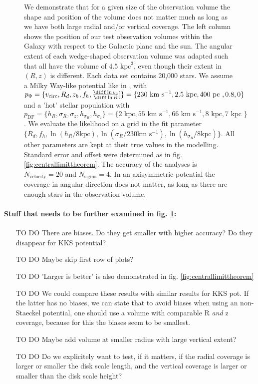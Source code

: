 \begin{figure}
\caption{We demonstrate that for a given size of the observation volume the shape and position of the volume does not matter much as long as we have both large radial and/or vertical coverage. The left column shows the position of our test observation volumes within the Galaxy with respect to the Galactic plane and the sun. The angular extent of each wedge-shaped observation volume was adapted such that all have the volume of $4.5 \text{ kpc}^3$, even though their extent in $(R,z)$ is different. Each data set contains 20,000 stars. We assume a Milky Way-like potential like in \citet{bov13}, with  $p_\Phi = \{v_\text{circ},R_d,z_h,f_h,\frac{\diff\ln v_c}{\diff\ln R}] \}=\{230 \text{ km s$^{-1}$},2.5\text{ kpc},400 \text{ pc }, 0.8,0\}$ and a 'hot' stellar population with $p_\text{DF} = \{ h_R, \sigma_R, \sigma_z,h_{\sigma_R},h_{\sigma_z}\} =\{2 \text{ kpc}, 55 \text{ km s$^{-1}$}, 66 \text{ km s$^{-1}$}, 8 \text{ kpc}, 7 \text{ kpc }\} $. We evaluate the likelihood on a grid in the fit parameter $\{R_d,f_h,\ln(h_R/8\text{kpc}),\ln(\sigma_{R}/230 \text{km s$^{-1}$}),\ln(h_{\sigma_R}/8\text{kpc}) \}$. All other parameters are kept at their true values in the modelling. Standard error and offset were determined as in fig. \ref{fig:centrallimittheorem}. The accuracy of the analyses is $N_\text{velocity} = 20$ and $N_\text{sigma} = 4$. In an axisymmetric potential the coverage in angular direction does not matter, as long as there are enough stars in the observation volume.}
\label{fig:obsvolumetest}
\end{figure}

\paragraph{Stuff that needs to be further examined in fig. \ref{fig:obsvolumetest}:}
\begin{itemize}
\item [TO DO] There are biases. Do they get smaller with higher accuracy? Do they disappear for KKS potential?
\item [TO DO] Maybe skip first row of plots?
\item [TO DO] 'Larger is better' is also demonstrated in fig. \ref{fig:centrallimittheorem}
\item [TO DO] We could compare these results with similar results for KKS pot. If the latter has no biases, we can state that to avoid biases when using an non-Staeckel potential, one should use a volume with comparable R \textit{and} z coverage, because for this the biases seem to be smallest.
\item [TO DO] Maybe add volume at smaller radius with large vertical extent?
\item [TO DO] Do we explicitely want to test, if it matters, if the radial coverage is larger or smaller the disk scale length, and the vertical coverage is larger or smaller than the disk scale height?
\end{itemize}

